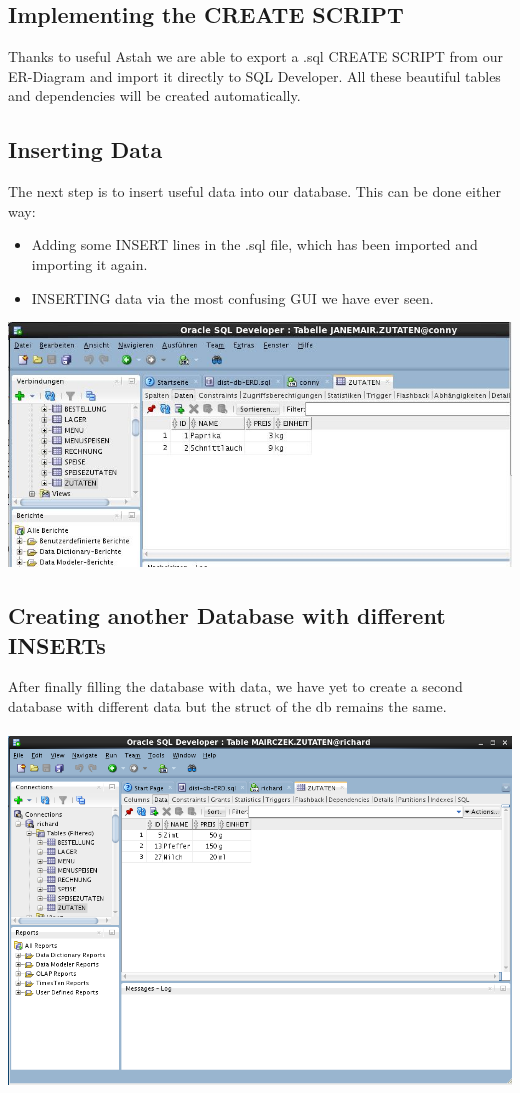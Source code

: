 \documentclass[11pt,a4paper]{article}
\begin{document}
\subsection{Implementing the CREATE SCRIPT}
Thanks to useful Astah we are able to export a .sql CREATE SCRIPT from our ER-Diagram and import it directly to SQL Developer. All these beautiful tables and dependencies will be created automatically.
\subsection{Inserting Data}
The next step is to insert useful data into our database. This can be done either way:
\begin{itemize}
	\item Adding some INSERT lines in the .sql file, which has been imported and importing it again.
	\item INSERTING data via the most confusing GUI we have ever seen.
\end{itemize}
\includegraphics{DataMair}
\subsection{Creating another Database with different INSERTs}
After finally filling the database with data, we have yet to create a second database with different data but the struct of the db remains the same. \\ \\
\includegraphics{richard}
\end{document}
